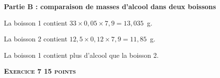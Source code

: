\documentclass[10pt]{article}
\begin{document}
\textbf{Partie B : comparaison de masses d'alcool dans deux boissons}
%
\smallskip
%
%
%
%
%		
%		
%		
%		
%		
%		

%
La boisson 1 contient $33 \times 0,05 \times 7,9 = 13,035$~g.

La boisson 2 contient $12,5 \times 0,12 \times 7,9 = 11,85$~g.

La boisson 1 contient  plus d'alcool que la boisson 2. 

\bigskip

\textbf{\textsc{Exercice 7  \hfill 15 points}}

\medskip
\end{document}
